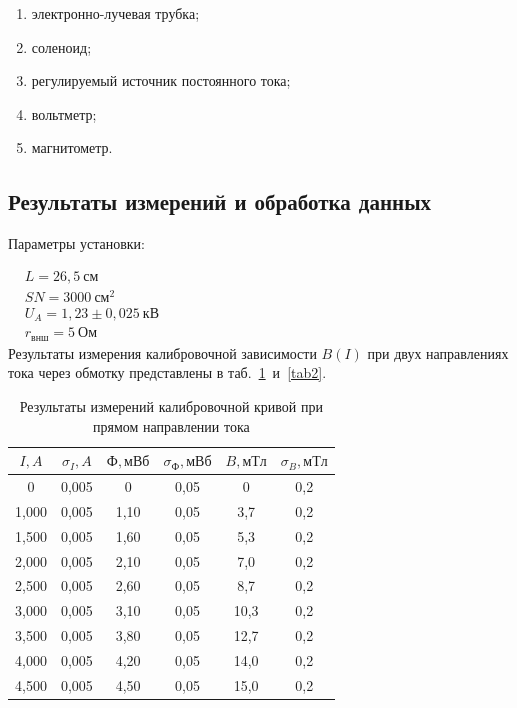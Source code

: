 \documentclass[a4paper, 12pt]{article}
\begin{document}
\begin{enumerate}
    \item электронно-лучевая трубка;
    \item соленоид;
    \item регулируемый источник постоянного тока;
    \item вольтметр;
    \item магнитометр.
\end{enumerate}

\subsection{Результаты измерений и обработка данных}

Параметры установки:

$\begin{aligned}
& L = 26,5~см\\
& SN = 3000~см^2\\
& U_A = 1,23\pm0,025~кВ\\
& r_{внш} = 5~Ом
\end{aligned}$\\[0,5 cm]

Результаты измерения калибровочной зависимости $B(I)$ при двух направлениях тока через обмотку представлены в таб.~\ref{tab1}~и~\ref{tab2}.

\begin{table}[h!]
\begin{center}
\begin{tabular}{|c|c|c|c|c|c|}
\hline
$I, A$ & $\sigma_{I}, A$ & $Ф, мВб$ & $\sigma_{Ф}, мВб$ & $B, мТл$ & $\sigma_{B}, мТл$ \\ \hline
0      & 0,005   & 0        & 0,05      & 0        & 0,2       \\ \hline
1,000  & 0,005   & 1,10     & 0,05      & 3,7      & 0,2       \\ \hline
1,500  & 0,005   & 1,60     & 0,05      & 5,3      & 0,2       \\ \hline
2,000  & 0,005   & 2,10     & 0,05      & 7,0      & 0,2       \\ \hline
2,500  & 0,005   & 2,60     & 0,05      & 8,7      & 0,2       \\ \hline
3,000  & 0,005   & 3,10     & 0,05      & 10,3     & 0,2       \\ \hline
3,500  & 0,005   & 3,80     & 0,05      & 12,7     & 0,2       \\ \hline
4,000  & 0,005   & 4,20     & 0,05      & 14,0     & 0,2       \\ \hline
4,500  & 0,005   & 4,50     & 0,05      & 15,0     & 0,2       \\ \hline
\end{tabular}
\end{center}
\caption{Результаты измерений калибровочной кривой при прямом направлении тока}
\label{tab1}
\end{table}
\end{document}
